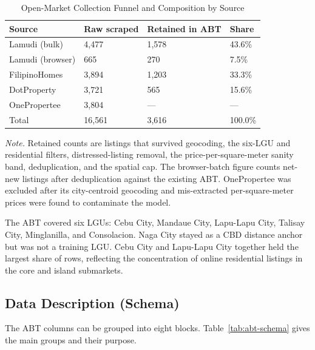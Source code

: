 \begin{table}[H]
\caption{Open-Market Collection Funnel and Composition by Source}
\label{tab:abt-source-composition}
\begin{center}
\begin{tabular}{L{0.27\textwidth} L{0.16\textwidth} L{0.17\textwidth} L{0.11\textwidth}}
\toprule
Source & Raw scraped & Retained in ABT & Share \\
\midrule
Lamudi (bulk) & 4{,}477 & 1{,}578 & 43.6\% \\
Lamudi (browser) & 665 & 270 & 7.5\% \\
FilipinoHomes & 3{,}894 & 1{,}203 & 33.3\% \\
DotProperty & 3{,}721 & 565 & 15.6\% \\
OnePropertee & 3{,}804 & --- & --- \\
\midrule
Total & 16{,}561 & 3{,}616 & 100.0\% \\
\bottomrule
\end{tabular}
\end{center}
\textit{Note.} Retained counts are listings that survived geocoding, the six-LGU and residential filters, distressed-listing removal, the price-per-square-meter sanity band, deduplication, and the spatial cap. The browser-batch figure counts net-new listings after deduplication against the existing ABT. OnePropertee was excluded after its city-centroid geocoding and mis-extracted per-square-meter prices were found to contaminate the model.
\end{table}

The ABT covered six LGUs: Cebu City, Mandaue City, Lapu-Lapu City, Talisay City, Minglanilla, and Consolacion. Naga City stayed as a CBD distance anchor but was not a training LGU. Cebu City and Lapu-Lapu City together held the largest share of rows, reflecting the concentration of online residential listings in the core and island submarkets.


\subsection{Data Description (Schema)}\label{data-description-schema}

The ABT columns can be grouped into eight blocks. Table~\ref{tab:abt-schema} gives the main groups and their purpose.

